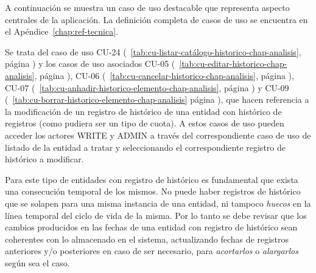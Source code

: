 A continuación se muestra un caso de uso destacable que representa
aspecto centrales de la aplicación. La definición completa de casos de uso se encuentra en el Apéndice~\ref{chap:ref-tecnica}. 

Se trata del caso de uso CU-24 (\tablename~\ref{tab:cu-listar-catálogo-historico-chap-analisis}, página \pageref{tab:cu-listar-catálogo-historico-chap-analisis}) y los casos de uso asociados  CU-05 (\tablename~\ref{tab:cu-editar-historico-chap-analisis}, página \pageref{tab:cu-editar-historico-chap-analisis}), CU-06 (\tablename~\ref{tab:cu-cancelar-historico-chap-analisis}, página \pageref{tab:cu-cancelar-historico-chap-analisis}), CU-07 (\tablename~\ref{tab:cu-anhadir-historico-elemento-chap-analisis}, página \pageref{tab:cu-anhadir-historico-elemento-chap-analisis}) y CU-09 (\tablename~\ref{tab:cu-borrar-historico-elemento-chap-analisis} página \pageref{tab:cu-borrar-historico-elemento-chap-analisis}), que hacen referencia a la modificación de un registro de histórico de una entidad con histórico de registros (como pudiera ser un tipo de cuota). A estos casos de uso pueden acceder los actores WRITE y ADMIN a través del correspondiente caso de uso de listado de la entidad a tratar y seleccionando el correspondiente registro de histórico a modificar.

Para este tipo de entidades con registro de histórico es fundamental que exista una consecución temporal de los mismos. No puede haber registros de histórico que se solapen para una misma instancia de una entidad, ni tampoco \textit{huecos} en la línea temporal del ciclo de vida de la misma. Por lo tanto se debe revisar que los cambios producidos en las fechas de una entidad con registro de histórico sean coherentes con lo almacenado en el sistema, actualizando fechas de registros anteriores y/o posteriores en caso de ser necesario, para \textit{acortarlos} o \textit{alargarlos} según sea el caso.


